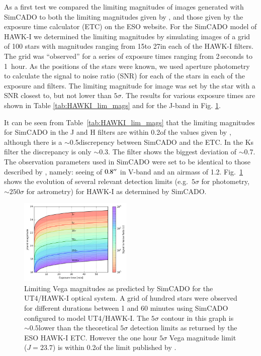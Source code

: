 As a first test we compared the limiting magnitudes of images generated with SimCADO to both the limiting magnitudes given by \citet{hawki}, and those given by the exposure time calculator (ETC) on the ESO website. For the SimCADO model of HAWK-I we determined the limiting magnitudes by simulating images of a grid of 100 stars with magnitudes ranging from 15\m to 27\m in each of the HAWK-I filters. The grid was ``observed'' for a series of exposure times ranging from 2\,seconds to 1~hour. As the positions of the stars were known, we used aperture photometry to calculate the signal to noise ratio (SNR) for each of the stars in each of the exposure and filters. The limiting magnitude for image was set by the star with a SNR closest to, but not lower than $5\sigma$. The results for various exposure times are shown in Table \ref{tab:HAWKI_lim_mags} and for the J-band in Fig. \ref{fig:HAWKI_rainbow_j}.

It can be seen from Table~\ref{tab:HAWKI_lim_mags} that the limiting magnitudes for SimCADO in the J and H filters are within 0.2\m of the values given by \citet{hawki}, although there is a $\sim$0.5\m discrepency between SimCADO and the ETC. In the Ks filter the discrepancy is only $\sim$0.3\m. The \brgamma filter shows the biggest deviation of $\sim$0.7\m. The observation parameters used in SimCADO were set to be identical to those described by \citet{hawki}, namely: seeing of $0.8^{\prime\prime}$ in V-band and an airmass of 1.2. Fig.~\ref{fig:HAWKI_rainbow_j} shows the evolution of several relevant detection limits (e.g.\ $5\sigma$ for photometry, $\sim 250\sigma$ for astrometry) for HAWK-I as determined by SimCADO.


\begin{figure}

    \centering
    \includegraphics[width=0.48\textwidth]{images/HAWKI_SNR_Rainbow_J}
    
    \caption{Limiting Vega magnitudes as predicted by SimCADO for the UT4/HAWK-I optical system. A grid of hundred stars were observed for different durations between 1 and 60 minutes using SimCADO configured to model UT4/HAWK-I. The $5\sigma$ contour in this graph is $\sim 0.5$\m lower than the theoretical $5\sigma$ detection limits as returned by the ESO HAWK-I ETC. However the one hour $5\sigma$ Vega magnitude limit ($J=23.7$\m) is within 0.2\m  of the limit published by \citet{hawki}.}
    \label{fig:HAWKI_rainbow_j}

\end{figure}


